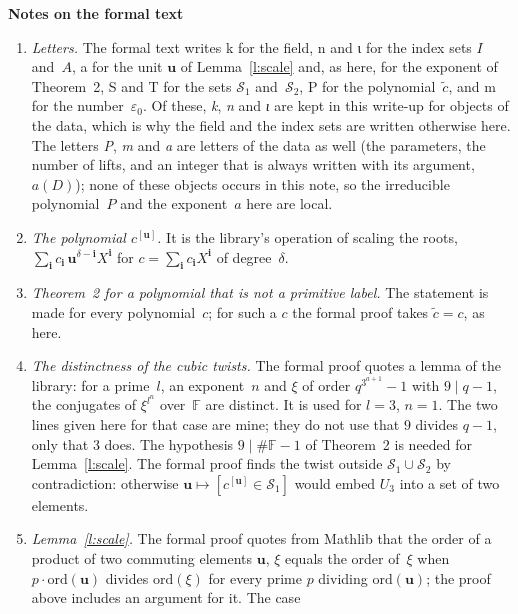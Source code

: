 \documentclass[11pt,a4paper]{article}
\newcommand{\leanfont}{\ttfamily\fontsize{8.6}{10.5}\selectfont\color{leancol}}
\newcommand{\F}{\mathbb{F}}
\newcommand{\m}[1]{\mbox{$#1$}}        %
\newcommand{\sect}[2]{\refstepcounter{section}\label{#2}\par\addvspace{19pt plus 4pt minus 2pt}\Needspace{7\baselineskip}%
  \noindent\llap{{\fontsize{13.2}{16}\selectfont\bfseries\color{inkfaint}\thesection}\hspace{9pt}}%
  {\fontsize{13.2}{16}\selectfont\bfseries\color{ink}#1}\par\nopagebreak\vspace{-1pt}}
\theoremstyle{plainx}
\theoremstyle{uprightx}
\begin{document}
\sect{Notes on the formal text}{s:notes}
\begin{enumerate}[label=\textup{\arabic*.},leftmargin=1.6em,itemsep=5pt]
\item \emph{Letters.} The formal text writes {\leanfont k} for the field, {\leanfont n} and {\leanfont ι} for the
index sets $I$ and~$A$, {\leanfont a} for the unit $\mathbf{u}$ of Lemma~\ref{l:scale} and, as here, for the exponent of
Theorem~2, {\leanfont S} and {\leanfont T} for the sets $\mathcal S_1$ and~$\mathcal S_2$, {\leanfont P} for the
polynomial~$\tilde c$, and {\leanfont m} for the number~$\varepsilon_0$. Of these, \emph{k}, \emph{n} and
\emph{ι} are kept in this write-up for objects of the data, which is why the field and the index sets are
written otherwise here. The letters \emph{P}, \emph{m} and \emph{a} are letters of the data as well (the
parameters, the number of lifts, and an integer that is always written with its argument, $a(D)$); none of these
objects occurs in this note, so the irreducible polynomial~$P$ and the exponent~$a$ here are local.
\item \emph{The polynomial $c^{[\mathbf{u}]}$.} It is the library's operation of scaling the roots, \m{\sum_{\mathbf{i}} c_{\mathbf{i}}\,\mathbf{u}^{\delta-\mathbf{i}}X^{\mathbf{i}}}
for \m{c=\sum_{\mathbf{i}}c_{\mathbf{i}}X^{\mathbf{i}}} of degree~$\delta$.
\item \emph{Theorem~2 for a polynomial that is not a primitive label.} The statement is made for every
polynomial~$c$; for such a $c$ the formal proof takes \m{\tilde c=c}, as here.
\item \emph{The distinctness of the cubic twists.} The formal proof quotes a lemma of the library: for a
prime~$l$, an exponent~$n$ and $\xi$ of order \m{q^{3^{a+1}}-1} with \m{9\mid q-1}, the conjugates of
\m{\xi^{l^n}} over~$\F$ are distinct. It is used for \m{l=3}, \m{n=1}. The two lines given here for that case are
mine; they do not use that $9$ divides \m{q-1}, only that $3$ does. The hypothesis \m{9\mid\#\F-1} of Theorem~2 is
needed for Lemma~\ref{l:scale}. The formal proof finds the twist outside \m{\mathcal S_1\cup\mathcal S_2} by
contradiction: otherwise \m{\mathbf{u}\mapsto[c^{[\mathbf{u}]}\in\mathcal S_1]} would embed $U_3$ into a set of two elements.
\item \emph{Lemma~\ref{l:scale}.} The formal proof quotes from Mathlib that the order of a product of two
commuting elements $\mathbf{u}$, $\xi$ equals the order of~$\xi$ when \m{p\cdot\mathrm{ord}(\mathbf{u})} divides \m{\mathrm{ord}(\xi)}
for every prime $p$ dividing \m{\mathrm{ord}(\mathbf{u})}; the proof above includes an argument for it. The case

\end{enumerate}
\end{document}
